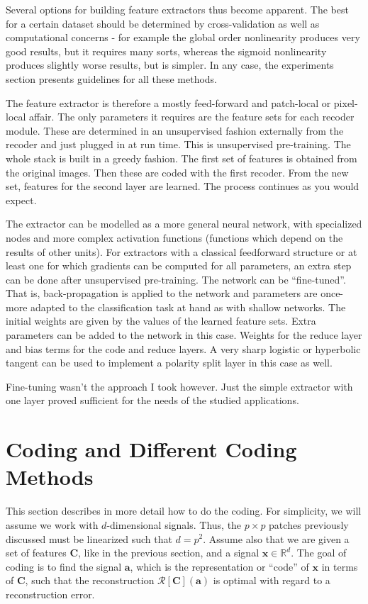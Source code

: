 \documentclass[12pt,a4paper,oneside,english]{UPBThesis}
\newcommand{\hctimes}[2]{{#1}\!\times\!{#2}}
\newcommand{\hcsignalspace}{\mathbb{R}^d}
\begin{document}
Several options for building feature extractors thus become apparent. The best for a certain dataset should be determined by cross-validation as well as computational concerns - for example the global order nonlinearity produces very good results, but it requires many sorts, whereas the sigmoid nonlinearity produces slightly worse results, but is simpler. In any case, the experiments section presents guidelines for all these methods.

The feature extractor is therefore a mostly feed-forward and patch-local or pixel-local affair. The only parameters it requires are the feature sets for each recoder module. These are determined in an unsupervised fashion externally from the recoder and just plugged in at run time. This is unsupervised pre-training. The whole stack is built in a greedy fashion. The first set of features is obtained from the original images. Then these are coded with the first recoder. From the new set, features for the second layer are learned. The process continues as you would expect. 

The extractor can be modelled as a more general neural network, with specialized nodes and more complex activation functions (functions which depend on the results of other units). For extractors with a classical feedforward structure or at least one for which gradients can be computed for all parameters, an extra step can be done after unsupervised pre-training. The network can be ``fine-tuned''. That is, back-propagation is applied to the network and parameters are once-more adapted to the classification task at hand as with shallow networks. The initial weights are given by the values of the learned feature sets. Extra parameters can be added to the network in this case. Weights for the reduce layer and bias terms for the code and reduce layers. A very sharp logistic or hyperbolic tangent can be used to implement a polarity split layer in this case as well.

Fine-tuning wasn't the approach I took however. Just the simple extractor with one layer proved sufficient for the needs of the studied applications. 

\chapter{Coding and Different Coding Methods}

This section describes in more detail how to do the coding. For simplicity, we will assume we work with $d$-dimensional signals. Thus, the $\hctimes{p}{p}$ patches previously discussed must be linearized such that $d = p^2$. Assume also that we are given a set of features $\textbf{C}$, like in the previous section, and a signal $\textbf{x} \in \hcsignalspace$. The goal of coding is to find the signal $\textbf{a}$, which is the representation or ``code'' of $\textbf{x}$ in terms of $\textbf{C}$, such that the reconstruction $\mathcal{R}[\textbf{C}](\textbf{a})$ is optimal with regard to a reconstruction error.
\end{document}
